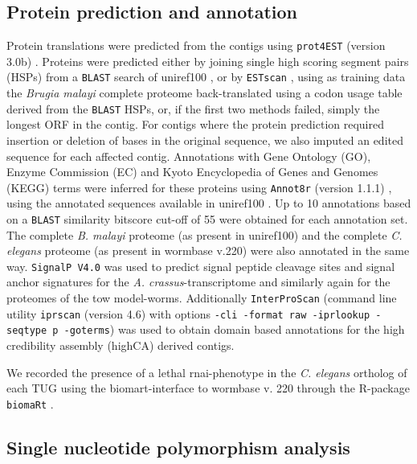 \documentclass[10pt]{bmc_article}
\newenvironment{bmcformat}{\begin{raggedright}\baselineskip20pt\sloppy\setboolean{publ}{false}}{\end{raggedright}\baselineskip20pt\sloppy}
\begin{document}
\begin{bmcformat}
\subsection*{Protein prediction and annotation}

Protein translations were predicted from the contigs using
\texttt{prot4EST} (version 3.0b)
\cite{wasmuth_prot4est:_2004}. Proteins were predicted either by
joining single high scoring segment pairs (HSPs) from a \texttt{BLAST}
search of uniref100 \cite{pmid18836194}, or by \texttt{ESTscan}
\cite{estscan}, using as training data the \textit{Brugia malayi}
complete proteome back-translated using a codon usage table derived
from the \texttt{BLAST} HSPs, or, if the first two methods failed,
simply the longest ORF in the contig. For contigs where the protein
prediction required insertion or deletion of bases in the original
sequence, we also imputed an edited sequence for each affected
contig. Annotations with Gene Ontology (GO), Enzyme Commission (EC)
and Kyoto Encyclopedia of Genes and Genomes (KEGG) terms were inferred
for these proteins using \texttt{Annot8r} (version 1.1.1)
\cite{schmid_annot8r:_2008}, using the annotated sequences available
in uniref100 \cite{pmid18836194}. Up to 10 annotations based on a
\texttt{BLAST} similarity bitscore cut-off of 55 were obtained for
each annotation set. The complete \textit{B. malayi} proteome (as
present in uniref100) and the complete \textit{C. elegans} proteome
(as present in wormbase v.220) were also annotated in the same
way. \texttt{SignalP V4.0} \cite{pmid21959131} was used to predict
signal peptide cleavage sites and signal anchor signatures for the
\textit{A. crassus}-transcriptome and similarly again for the
proteomes of the tow model-worms.  Additionally \texttt{InterProScan}
\cite{pmid11590104} (command line utility \texttt{iprscan} (version
4.6) with options \texttt{-cli -format raw -iprlookup -seqtype p
  -goterms}) was used to obtain domain based annotations for the high
credibility assembly (highCA) derived contigs.

We recorded the presence of a lethal rnai-phenotype in the
\textit{C. elegans} ortholog of each TUG using the biomart-interface
\cite{pmid22083790} to wormbase v. 220 through the R-package
\texttt{biomaRt} \cite{pmid19617889}.

\subsection*{Single nucleotide polymorphism analysis}


\end{bmcformat}
\end{document}
